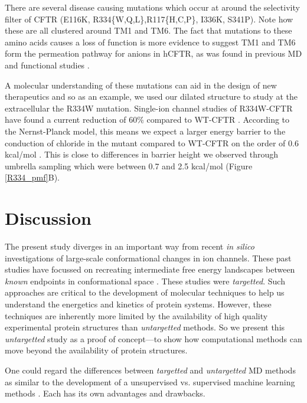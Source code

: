 There are several disease causing mutations which occur at around the selectivity filter of CFTR (E116K, R334\{W,Q,L\},R117\{H,C,P\}, I336K, S341P)\cite{cftr2}. Note how these are all clustered around TM1 and TM6. The fact that mutations to these amino acids causes a loss of function is more evidence to suggest TM1 and TM6 form the permeation pathway for anions in hCFTR, as was found in previous MD and functional studies \cite{zeng2021,farkas2020, linsdell2016, linsdell2018}. 

A molecular understanding of these mutations can aid in the design of new therapeutics and so as an example, we used our dilated structure to study at the extracellular the R334W mutation. Single-ion channel studies of R334W-CFTR have found a current reduction of 60\% compared to WT-CFTR \cite{gong2004}. According to the Nernst-Planck model, this means we expect a larger energy barrier to the conduction of chloride in the mutant compared to WT-CFTR on the order of 0.6 kcal/mol \cite{kuyucak2001}. This is close to differences in barrier height we observed through umbrella sampling which were between 0.7 and 2.5 kcal/mol (Figure \ref{R334_pmf}B). 

\section{Discussion}

The present study diverges in an important way from recent \textit{in silico} investigations of large-scale conformational changes in ion channels. These past studies have focussed on recreating intermediate free energy landscapes between \textit{known} endpoints in conformational space \cite{lev2020, bergh2021, moradi2015}. These studies were \textit{targetted}. Such approaches are critical to the development of molecular techniques to help us understand the energetics and kinetics of protein systems. However, these techniques are inherently more limited by the availability of high quality experimental protein structures than \textit{untargetted} methods. So we present this \textit{untargetted} study as a proof of concept---to show how computational methods can move beyond the availability of protein structures.

One could regard the differences between \textit{targetted} and \textit{untargetted} MD methods as similar to the development of a unsupervised vs. supervised machine learning methods \cite{grus2015, friedman2017}. Each has its own advantages and drawbacks.

